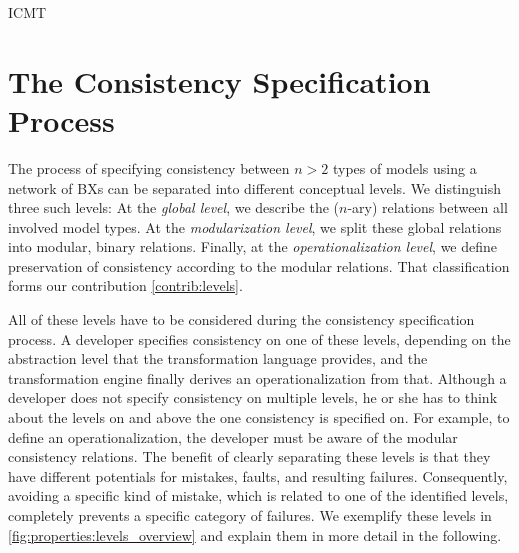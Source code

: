 \begin{copiedFrom}{ICMT}

\section{The Consistency Specification Process}


The process of specifying consistency between $n>2$ types of models using a network of \acp{BX} can be separated into different conceptual levels.
We distinguish three such levels:
At the \emph{global level}, we describe the ($n$-ary) relations between all involved model types.
At the \emph{modularization level}, we split these global relations into modular, binary relations.
Finally, at the \emph{operationalization level}, we define preservation of consistency %
according to the modular relations.
That classification forms our contribution \ref{contrib:levels}.

All of these levels have to be considered during the consistency specification process.
A developer specifies consistency on one of these levels, depending on the abstraction level that the transformation language provides, and the transformation engine finally derives an operationalization from that.
Although a developer does not specify consistency on multiple levels, he or she has to think about the levels on and above the one consistency is specified on.
For example, to define an operationalization, the developer must be aware of the modular consistency relations.
The benefit of clearly separating these levels is that they have different potentials for mistakes, faults, and resulting failures. 
Consequently, avoiding a specific kind of mistake, which is related to one of the identified levels, completely prevents a specific category of failures.
We exemplify these levels in \autoref{fig:properties:levels_overview} and explain them in more detail in the following.


\end{copiedFrom}
